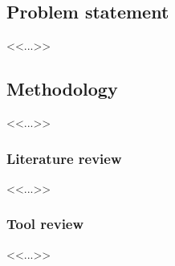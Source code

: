 \subsection{Problem statement}
<<...>>

\subsection{Methodology}
<<...>>

\subsubsection{Literature review}
<<...>>

\subsubsection{Tool review}
<<...>>